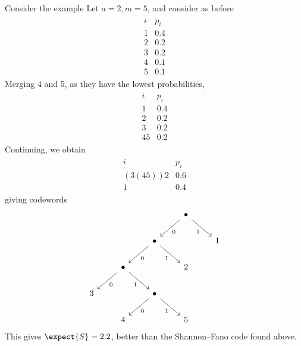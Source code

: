 \begin{example}
    Consider the example
    Let $a = 2, m = 5$, and consider as before
    \begin{align*}
        \begin{array}{cc}
            i & p_i \\
            1 & 0.4 \\
            2 & 0.2 \\
            3 & 0.2 \\
            4 & 0.1 \\
            5 & 0.1
    \end{array}
    \end{align*}
    Merging 4 and 5, as they have the lowest probabilities,
    \begin{align*}
        \begin{array}{cc}
        i & p_i \\
        1 & 0.4 \\
        2 & 0.2 \\
        3 & 0.2 \\
        45 & 0.2
    \end{array}
    \end{align*}
    Continuing, we obtain
    \begin{align*}
        \begin{array}{cc}
        i & p_i \\
        (3(45))2 & 0.6 \\
        1 & 0.4
    \end{array}
    \end{align*}
    giving codewords
    \[
        \begin{tikzcd}
            &&& \bullet \\
            && \bullet && 1 \\
            & \bullet && 2 \\
            3 && \bullet \\
            & 4 && 5
            \arrow["0", from=3-2, to=4-1]
            \arrow["1"', from=3-2, to=4-3]
            \arrow["0", from=4-3, to=5-2]
            \arrow["1"', from=4-3, to=5-4]
            \arrow["0", from=2-3, to=3-2]
            \arrow["1"', from=2-3, to=3-4]
            \arrow["0", from=1-4, to=2-3]
            \arrow["1"', from=1-4, to=2-5]
        \end{tikzcd}
    \]
    This gives $\expect{S} = 2.2$, better than the Shannon--Fano code found above.
\end{example}

